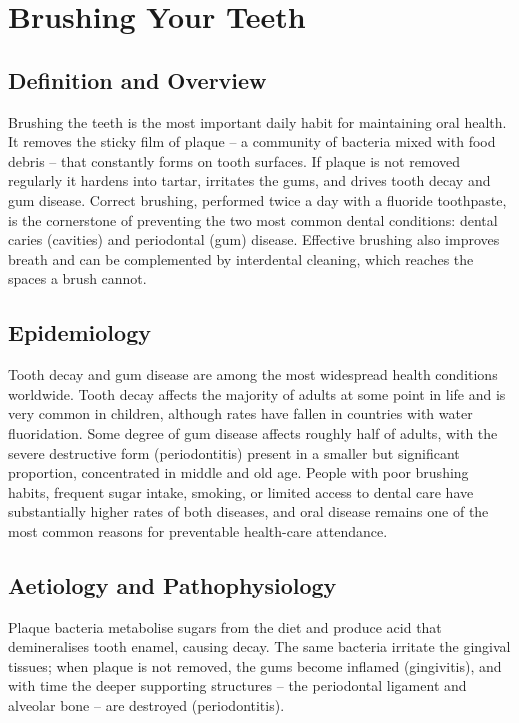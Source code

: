 \chapter{Brushing Your Teeth}

\section*{Definition and Overview}
Brushing the teeth is the most important daily habit for maintaining oral health. It removes the sticky film of plaque -- a community of bacteria mixed with food debris -- that constantly forms on tooth surfaces. If plaque is not removed regularly it hardens into tartar, irritates the gums, and drives tooth decay and gum disease. Correct brushing, performed twice a day with a fluoride toothpaste, is the cornerstone of preventing the two most common dental conditions: dental caries (cavities) and periodontal (gum) disease. Effective brushing also improves breath and can be complemented by interdental cleaning, which reaches the spaces a brush cannot.

\section*{Epidemiology}
Tooth decay and gum disease are among the most widespread health conditions worldwide. Tooth decay affects the majority of adults at some point in life and is very common in children, although rates have fallen in countries with water fluoridation. Some degree of gum disease affects roughly half of adults, with the severe destructive form (periodontitis) present in a smaller but significant proportion, concentrated in middle and old age. People with poor brushing habits, frequent sugar intake, smoking, or limited access to dental care have substantially higher rates of both diseases, and oral disease remains one of the most common reasons for preventable health-care attendance.

\section*{Aetiology and Pathophysiology}
Plaque bacteria metabolise sugars from the diet and produce acid that demineralises tooth enamel, causing decay. The same bacteria irritate the gingival tissues; when plaque is not removed, the gums become inflamed (gingivitis), and with time the deeper supporting structures -- the periodontal ligament and alveolar bone -- are destroyed (periodontitis).

